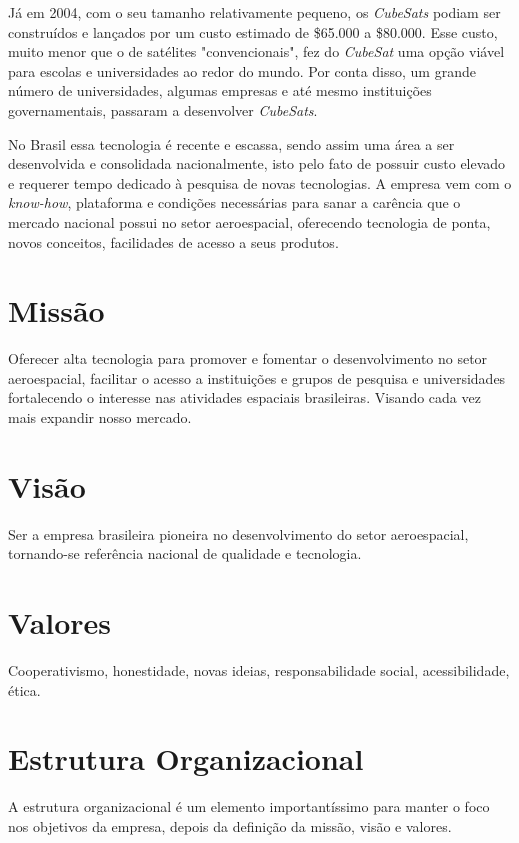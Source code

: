 \documentclass[
	12pt,				%
	openright,			%
	oneside,			%
	a4paper,			%
	english,			%
	french,				%
	spanish,			%
	brazil				%
	]{abntex2}
\begin{document}
	Já em 2004, com o seu tamanho relativamente pequeno, os \textit{CubeSats} podiam ser construídos e lançados por um custo estimado de \$65.000 a \$80.000. Esse custo, muito menor que o de satélites "convencionais", fez do \textit{CubeSat} uma opção viável para escolas e universidades ao redor do mundo. Por conta disso, um grande número de universidades, algumas empresas e até mesmo instituições governamentais, passaram a desenvolver \textit{CubeSats}.
	
	No Brasil essa tecnologia é recente e escassa, sendo assim uma área a ser desenvolvida e consolidada nacionalmente, isto pelo fato de possuir custo elevado e requerer tempo dedicado à pesquisa de novas tecnologias.
A empresa vem com o \textit{know-how}, plataforma e condições necessárias para sanar a carência que o mercado nacional possui no setor aeroespacial, oferecendo tecnologia de ponta, novos conceitos, facilidades de acesso a seus produtos.

\section[Missão]{Missão}
	
	Oferecer alta tecnologia para promover e fomentar o desenvolvimento no setor aeroespacial, facilitar o acesso a instituições e grupos de pesquisa e universidades fortalecendo o interesse nas atividades espaciais brasileiras. Visando cada vez mais expandir nosso mercado.
	
\section[Visão]{Visão}	
	
	Ser a empresa brasileira pioneira no desenvolvimento do setor aeroespacial, tornando-se referência nacional de qualidade e tecnologia.
	
\section[Valores]{Valores}

	Cooperativismo, honestidade, novas ideias, responsabilidade social, acessibilidade, ética.

\section[Estrutura Organizacional]{Estrutura Organizacional}

	A estrutura organizacional é um elemento importantíssimo para manter o foco nos objetivos da empresa, depois da definição da missão, visão e valores.	
	
\end{document}
